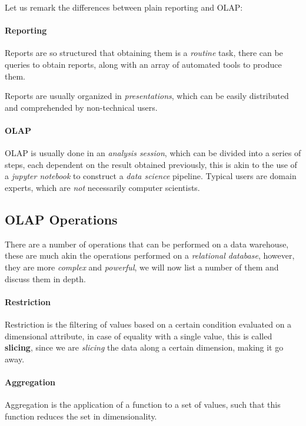 \documentclass[openright, twoside, twocolumn]{report}
\begin{document}
Let us remark the differences between plain reporting and OLAP:

\paragraph{Reporting} 
Reports are so structured that obtaining them is a \emph{routine} task, there can 
be queries to obtain reports, along with an array of automated tools to produce them.

Reports are usually organized in \emph{presentations}, which can be easily distributed 
and comprehended by non-technical users.

\paragraph{OLAP}
OLAP is usually done in an \emph{analysis session}, which can be divided into a 
series of steps, each dependent on the result obtained previously, this is akin 
to the use of a \emph{jupyter notebook} to construct a \emph{data science} pipeline.
Typical users are domain experts, which are \emph{not} necessarily computer scientists.

\subsection{OLAP Operations}

There are a number of operations that can be performed on a data warehouse, these 
are much akin the operations performed on a \emph{relational database}, however,
they are more \emph{complex} and \emph{powerful}, we will now list a number of them 
and discuss them in depth.

\paragraph{Restriction} 

Restriction is the filtering of values based on a certain condition evaluated 
on a dimensional attribute, in case of equality with a single value, this is called
\textbf{slicing}, since we are \emph{slicing} the data along a certain dimension, making 
it go away.

\paragraph{Aggregation}

Aggregation is the application of a function to a set of values, such that this 
function reduces the set in dimensionality.
\end{document}
